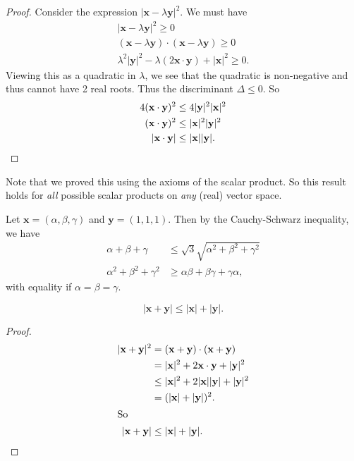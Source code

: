 \documentclass[a4paper]{article}
\begin{document}
\begin{proof}
  Consider the expression $|\mathbf{x} - \lambda \mathbf{y}|^2$. We must have
  \begin{align*}
    |\mathbf{x} - \lambda\mathbf{y}|^2 \geq 0\\
    (\mathbf{x} - \lambda\mathbf{y})\cdot (\mathbf{x} - \lambda\mathbf{y}) \geq 0\\
    \lambda^2 |\mathbf{y}|^2 - \lambda (2\mathbf{x\cdot y}) + |\mathbf{x}|^2 \geq 0.
  \end{align*}
  Viewing this as a quadratic in $\lambda$, we see that the quadratic is non-negative and thus cannot have 2 real roots. Thus the discriminant $\Delta \leq 0$. So
  \begin{align*}
    4(\mathbf{x\cdot y})^2 &\leq 4|\mathbf{y}|^2|\mathbf{x}|^2\\
    (\mathbf{x\cdot y})^2 &\leq |\mathbf{x}|^2|\mathbf{y}|^2\\
    |\mathbf{x\cdot y}| &\leq \mathbf{|x||y|}. \qedhere
  \end{align*}
\end{proof}
Note that we proved this using the axioms of the scalar product. So this result holds for \emph{all} possible scalar products on \emph{any} (real) vector space.

\begin{eg}
  Let $\mathbf{x} = (\alpha, \beta, \gamma)$ and $\mathbf{y} = (1, 1, 1)$. Then by the Cauchy-Schwarz inequality, we have
  \begin{align*}
    \alpha + \beta + \gamma &\leq \sqrt{3}\sqrt{\alpha^2 + \beta^2 + \gamma^2}\\
    \alpha^2 + \beta^2 + \gamma^2 &\geq \alpha\beta + \beta\gamma + \gamma\alpha,
  \end{align*}
  with equality if $\alpha = \beta = \gamma$.
\end{eg}

\begin{cor}
  \[
    \mathbf{|x + y|} \leq \mathbf{|x| + |y|}.
  \]
\end{cor}
\begin{proof}
  \begin{align*}
    |\mathbf{x + y}|^2 &= \mathbf{(x + y)\cdot (x + y)}\\
    &= |\mathbf{x}|^2 + 2\mathbf{x\cdot y} + |\mathbf{y}|^2\\
    &\leq |\mathbf{x}|^2 + 2\mathbf{|x||y|} + |\mathbf{y}|^2\\
    &= (\mathbf{|x| + |y|})^2.\\
    \intertext{So}
    \mathbf{|x + y|} &\leq \mathbf{|x| + |y|}. \qedhere
  \end{align*}
\end{proof}
\end{document}
